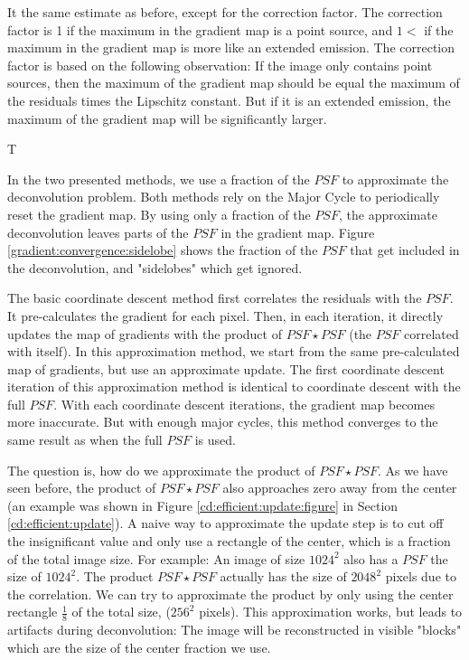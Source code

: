 It the same estimate as before, except for the correction factor. The correction factor is 1 if the maximum in the gradient map is a point source, and $1 <$ if the maximum in the gradient map is more like an extended emission. The correction factor is based on the following observation: If the image only contains point sources, then the maximum of the gradient map should be equal the maximum of the residuals times the Lipschitz constant. But if it is an extended emission, the maximum of the gradient map will be significantly larger.


T

In the two presented methods, we use a fraction of the $PSF$ to approximate the deconvolution problem. Both methods rely on the Major Cycle to periodically reset the gradient map. By using only a fraction of the $PSF$, the approximate deconvolution leaves parts of the $PSF$ in the gradient map. Figure \ref{gradient:convergence:sidelobe} shows the fraction of the $PSF$ that get included in the deconvolution, and "sidelobes" which get ignored.




The basic coordinate descent method first correlates the residuals with the $PSF$. It pre-calculates the gradient for each pixel. Then, in each iteration, it directly updates the map of gradients with the product of $PSF \star PSF$ (the $PSF$ correlated with itself). In this approximation method, we start from the same pre-calculated map of gradients, but use an approximate update. The first coordinate descent iteration of this approximation method is identical to coordinate descent with the full $PSF$. With each coordinate descent iterations, the gradient map becomes more inaccurate. But with enough major cycles, this method converges to the same result as when the full $PSF$ is used.

The question is, how do we approximate the product of $PSF \star PSF$. As we have seen before, the product of $PSF \star PSF$ also approaches zero away from the center (an example was shown in Figure \ref{cd:efficient:update:figure} in Section \ref{cd:efficient:update}). A naive way to approximate the update step is to cut off the insignificant value and only use a rectangle of the center, which is a fraction of the total image size. For example: An image of size $1024^2$ also has a $PSF$ the size of $1024^2$. The product $PSF \star PSF$ actually has the size of $2048^2$ pixels due to the correlation. We can try to approximate the product by only using the center rectangle $\frac{1}{8}$ of the total size, ($256^2$ pixels). This approximation works, but leads to artifacts during deconvolution: The image will be reconstructed in visible "blocks" which are the size of the center fraction we use. 

